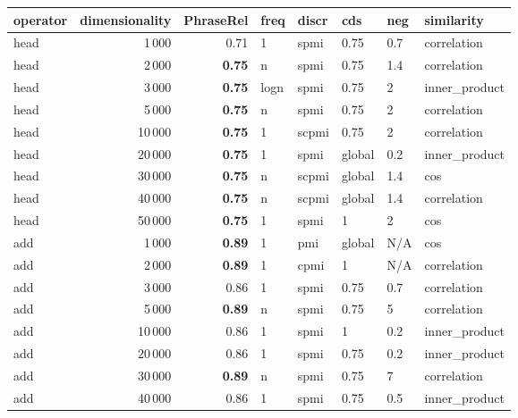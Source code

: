 \begin{tabular}{lrrlllll}
\toprule
operator &  dimensionality &  PhraseRel &  freq &  discr &     cds &  neg &     similarity \\
\midrule
    head &            1\,000 &       0.71 &     1 &   spmi &    0.75 &  0.7 &    correlation \\
    head &            2\,000 &       \textbf{0.75} &     n &   spmi &    0.75 &  1.4 &    correlation \\
    head &            3\,000 &       \textbf{0.75} &  logn &   spmi &    0.75 &    2 &  inner\_product \\
    head &            5\,000 &       \textbf{0.75} &     n &   spmi &    0.75 &    2 &    correlation \\
    head &           10\,000 &       \textbf{0.75} &     1 &  scpmi &    0.75 &    2 &    correlation \\
    head &           20\,000 &       \textbf{0.75} &     1 &   spmi &  global &  0.2 &  inner\_product \\
    head &           30\,000 &       \textbf{0.75} &     n &  scpmi &  global &  1.4 &            cos \\
    head &           40\,000 &       \textbf{0.75} &     n &  scpmi &  global &  1.4 &    correlation \\
    head &           50\,000 &       \textbf{0.75} &     1 &   spmi &       1 &    2 &            cos \\ \addlinespace
     add &            1\,000 &       \textbf{0.89} &     1 &    pmi &  global &  N/A &            cos \\
     add &            2\,000 &       \textbf{0.89} &     1 &   cpmi &       1 &  N/A &    correlation \\
     add &            3\,000 &       0.86 &     1 &   spmi &    0.75 &  0.7 &    correlation \\
     add &            5\,000 &       \textbf{0.89} &     n &   spmi &    0.75 &    5 &    correlation \\
     add &           10\,000 &       0.86 &     1 &   spmi &       1 &  0.2 &  inner\_product \\
     add &           20\,000 &       0.86 &     1 &   spmi &    0.75 &  0.2 &  inner\_product \\
     add &           30\,000 &       \textbf{0.89} &     n &   spmi &    0.75 &    7 &    correlation \\
     add &           40\,000 &       0.86 &     1 &   spmi &    0.75 &  0.5 &  inner\_product \\

\end{tabular}
